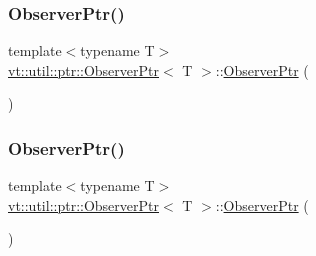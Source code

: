 \subsubsection{\texorpdfstring{Observer\+Ptr()}{ObserverPtr()}\hspace{0.1cm}{\footnotesize\ttfamily [3/5]}}
{\footnotesize\ttfamily template$<$typename T$>$ \\
\hyperlink{structvt_1_1util_1_1ptr_1_1_observer_ptr}{vt\+::util\+::ptr\+::\+Observer\+Ptr}$<$ T $>$\+::\hyperlink{structvt_1_1util_1_1ptr_1_1_observer_ptr}{Observer\+Ptr} (\begin{DoxyParamCaption}{ }\end{DoxyParamCaption})\hspace{0.3cm}{\ttfamily [default]}}

\mbox{\label{structvt_1_1util_1_1ptr_1_1_observer_ptr_ac156b77e1a813a2cb9d5d32578dba8ac}} 
\subsubsection{\texorpdfstring{Observer\+Ptr()}{ObserverPtr()}\hspace{0.1cm}{\footnotesize\ttfamily [4/5]}}
{\footnotesize\ttfamily template$<$typename T$>$ \\
\hyperlink{structvt_1_1util_1_1ptr_1_1_observer_ptr}{vt\+::util\+::ptr\+::\+Observer\+Ptr}$<$ T $>$\+::\hyperlink{structvt_1_1util_1_1ptr_1_1_observer_ptr}{Observer\+Ptr} (\begin{DoxyParamCaption}\item[{\hyperlink{structvt_1_1util_1_1ptr_1_1_observer_ptr}{Observer\+Ptr}$<$ T $>$ const \&}]{ }\end{DoxyParamCaption})\hspace{0.3cm}{\ttfamily [default]}}

\mbox{\label{structvt_1_1util_1_1ptr_1_1_observer_ptr_abbd144c94f936c6b027508e316270edc}} 
